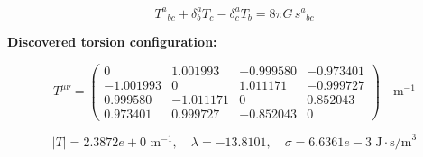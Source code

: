 
\begin{equation}
  T^a{}_{bc} + \delta^a_b T_c - \delta^a_c T_b = 8\pi G \, s^a{}_{bc}
\end{equation}

\textbf{Discovered torsion configuration:}

\begin{equation}
  T^{\mu\nu} = \begin{pmatrix}
    0 & 1.001993 & -0.999580 & -0.973401 \\
    -1.001993 & 0 & 1.011171 & -0.999727 \\
    0.999580 & -1.011171 & 0 & 0.852043 \\
    0.973401 & 0.999727 & -0.852043 & 0
  \end{pmatrix} \quad \text{m}^{-1}
\end{equation}

\begin{equation}
  |T| = 2.3872e+0 \text{ m}^{-1}, \quad
  \lambda = -13.8101, \quad
  \sigma = 6.6361e-3 \text{ J}\cdot\text{s/m}^3
\end{equation}
